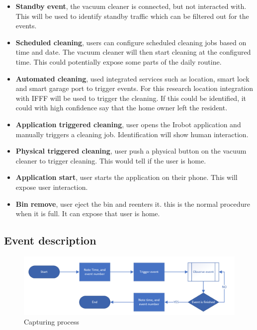 \begin{itemize}
    \item \textbf{Standby event}, the vacuum cleaner is connected, but not interacted with. This will be used to identify standby traffic which can be filtered out for the events. 
    \item \textbf{Scheduled cleaning}, users can configure scheduled cleaning jobs based on time and date. The vacuum cleaner will then start cleaning at the configured time. This could potentially expose some parts of the daily routine.
    \item \textbf{Automated cleaning}, used integrated services such as location, smart lock and smart garage port to trigger events. For this research location integration with IFFF will be used to trigger the cleaning. If this could be identified, it could with high confidence say that the home owner left the resident.
    \item \textbf{Application triggered cleaning}, user opens the Irobot application and manually triggers a cleaning job. Identification will show human interaction.
    \item \textbf{Physical triggered cleaning}, user push a physical button on the vacuum cleaner to trigger cleaning. This would tell if the user is home. 
    \item \textbf{Application start}, user starts the application on their phone. This will expose user interaction. 
    \item \textbf{Bin remove}, user eject the bin and reenters it. this is the normal procedure when it is full. It can expose that user is home. 
\end{itemize}

\subsection{Event description}

\begin{figure}[H]
    \centering
    \includegraphics[width=\textwidth]{figures/EventTriggeringProcess.png}
    \caption{Capturing process}
    \label{fig:EventTriggeringProcess}
\end{figure}

